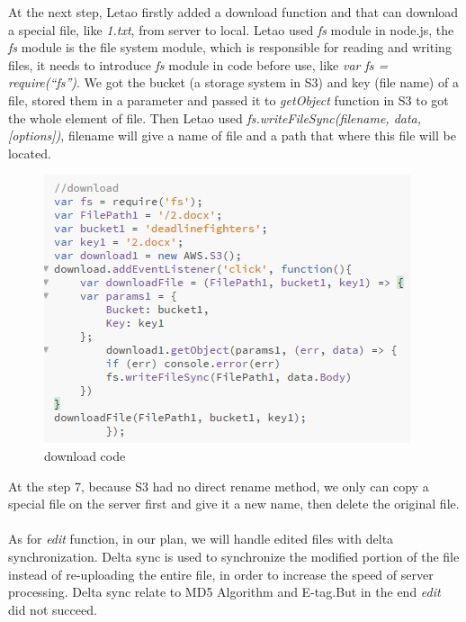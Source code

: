 \documentclass[a4paper]{article}
\begin{document}
{At the next step, Letao firstly added a download function and that can download a special file, like \emph{1.txt}, from server to local. Letao used \emph{fs} module in node.js, the \emph{fs} module is the file system module, which is responsible for reading and writing files, it needs to introduce \emph{fs} module in code before use, like \emph{var fs = require(“fs”)}. We got the bucket (a storage system in S3) and key (file name) of a file, stored them in a parameter and passed it to \emph{getObject} function in S3 to got the whole element of file. Then Letao used \emph{fs.writeFileSync(filename, data, [options])}, filename will give a name of file and a path that where this file will be located. 

\begin{figure}[h!]
\centering
\includegraphics[scale=1.3]{code1}
\caption{download code}
\label{fig:code1}
\end{figure}

At the step 7, because S3 had no direct rename method, we only can copy a special file on the server first and give it a new name, then delete the original file.\\\\

As for \emph{edit} function, in our plan, we will handle edited files with delta synchronization. Delta sync is used to synchronize the modified portion of the file instead of re-uploading the entire file, in order to increase the speed of server processing. Delta sync relate to MD5 Algorithm and E-tag.But in the end \emph{edit} did not succeed.\\\\

}
\end{document}
